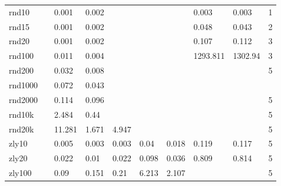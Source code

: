 \begin{landscape}
\begin{table}[h]
\begin{tabular}{llllllllll}
		rnd10   &       & 0.001  & 0.002   &          &            &            & 0.003    & 0.003   & 1     \\
		rnd15   &       & 0.001  & 0.002   &          &            &            & 0.048    & 0.043   & 2     \\
		rnd20   &       & 0.001  & 0.002   &          &            &            & 0.107    & 0.112   & 3     \\
		rnd100  &       & 0.011  & 0.004   &          &            &            & 1293.811 & 1302.94 & 3     \\
		rnd200  &       & 0.032  & 0.008   &          &            &            &          &         & 5     \\
		rnd1000 &       & 0.072  & 0.043   &          &            &            &          &         &       \\
		rnd2000 &       & 0.114  & 0.096   &          &            &            &          &         & 5     \\
		rnd10k  &       & 2.484  & 0.44    &          &            &            &          &         & 5     \\
		rnd20k  &       & 11.281 & 1.671   & 4.947    &            &            &          &         & 5     \\
		zly10   &       & 0.005  & 0.003   & 0.003    & 0.04       & 0.018      & 0.119    & 0.117   & 5     \\
		zly20   &       & 0.022  & 0.01    & 0.022    & 0.098      & 0.036      & 0.809    & 0.814   & 5     \\
		zly100  &       & 0.09   & 0.151   & 0.21     & 6.213      & 2.107      &          &         & 5    
	\end{tabular}
\end{table}
\end{landscape}
